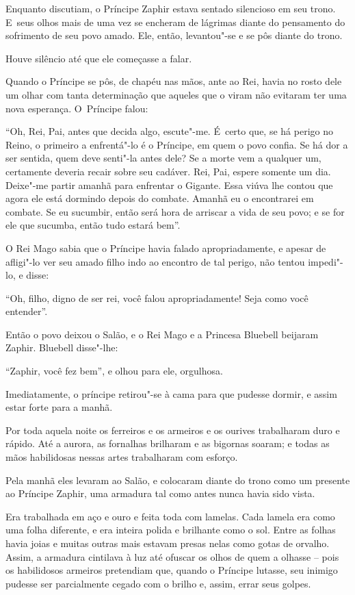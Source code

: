 Enquanto discutiam, o Príncipe Zaphir estava sentado silencioso em seu
trono. E~seus olhos mais de uma vez se encheram de lágrimas diante do
pensamento do sofrimento de seu povo amado. Ele, então, levantou"-se e se
pôs diante do trono.

Houve silêncio até que ele começasse a falar.

Quando o Príncipe se pôs, de chapéu nas mãos, ante ao Rei, havia no
rosto dele um olhar com tanta determinação que aqueles que o viram não
evitaram ter uma nova esperança. O~Príncipe falou:

``Oh, Rei, Pai, antes que decida algo, escute"-me. É~certo que, se há
perigo no Reino, o primeiro a enfrentá"-lo é o Príncipe, em quem o povo
confia. Se há dor a ser sentida, quem deve senti"-la antes dele? Se a
morte vem a qualquer um, certamente deveria recair sobre seu cadáver.
Rei, Pai, espere somente um dia. Deixe"-me partir amanhã para enfrentar o
Gigante. Essa viúva lhe contou que agora ele está dormindo depois do
combate. Amanhã eu o encontrarei em combate. Se eu sucumbir, então será
hora de arriscar a vida de seu povo; e se for ele que sucumba, então
tudo estará bem''.

O Rei Mago sabia que o Príncipe havia falado apropriadamente, e apesar
de afligi"-lo ver seu amado filho indo ao encontro de tal perigo, não
tentou impedi"-lo, e disse:

``Oh, filho, digno de ser rei, você falou apropriadamente! Seja como
você entender''.

Então o povo deixou o Salão, e o Rei Mago e a Princesa Bluebell beijaram
Zaphir. Bluebell disse"-lhe:

``Zaphir, você fez bem'', e olhou para ele, orgulhosa.

Imediatamente, o príncipe retirou"-se à cama para que pudesse dormir, e
assim estar forte para a manhã.

Por toda aquela noite os ferreiros e os armeiros e os ourives
trabalharam duro e rápido. Até a aurora, as fornalhas brilharam e as
bigornas soaram; e todas as mãos habilidosas nessas artes trabalharam
com esforço.

Pela manhã eles levaram ao Salão, e colocaram diante do trono como um
presente ao Príncipe Zaphir, uma armadura tal como antes nunca havia
sido vista.

Era trabalhada em aço e ouro e feita toda com lamelas. Cada lamela era
como uma folha diferente, e era inteira polida e brilhante como o sol.
Entre as folhas havia joias e muitas outras mais estavam presas nelas
como gotas de orvalho. Assim, a armadura cintilava à luz até ofuscar os
olhos de quem a olhasse -- pois os habilidosos armeiros pretendiam que,
quando o Príncipe lutasse, seu inimigo pudesse ser parcialmente cegado
com o brilho e, assim, errar seus golpes.

